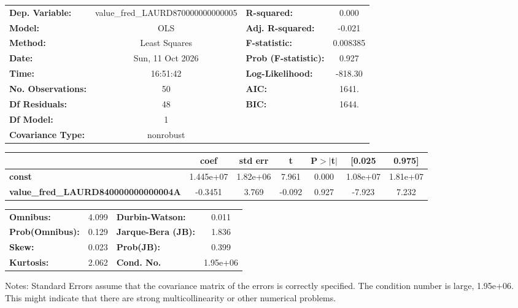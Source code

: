 \begin{center}
\begin{tabular}{lclc}
\toprule
\textbf{Dep. Variable:}                     & value\_fred\_LAURD870000000000005 & \textbf{  R-squared:         } &     0.000   \\
\textbf{Model:}                             &                OLS                & \textbf{  Adj. R-squared:    } &    -0.021   \\
\textbf{Method:}                            &           Least Squares           & \textbf{  F-statistic:       } &  0.008385   \\
\textbf{Date:}                              &          Sun, 11 Oct 2026         & \textbf{  Prob (F-statistic):} &    0.927    \\
\textbf{Time:}                              &              16:51:42             & \textbf{  Log-Likelihood:    } &   -818.30   \\
\textbf{No. Observations:}                  &                   50              & \textbf{  AIC:               } &     1641.   \\
\textbf{Df Residuals:}                      &                   48              & \textbf{  BIC:               } &     1644.   \\
\textbf{Df Model:}                          &                    1              & \textbf{                     } &             \\
\textbf{Covariance Type:}                   &             nonrobust             & \textbf{                     } &             \\
\bottomrule
\end{tabular}
\begin{tabular}{lcccccc}
                                            & \textbf{coef} & \textbf{std err} & \textbf{t} & \textbf{P$> |$t$|$} & \textbf{[0.025} & \textbf{0.975]}  \\
\midrule
\textbf{const}                              &    1.445e+07  &     1.82e+06     &     7.961  &         0.000        &     1.08e+07    &     1.81e+07     \\
\textbf{value\_fred\_LAURD840000000000004A} &      -0.3451  &        3.769     &    -0.092  &         0.927        &       -7.923    &        7.232     \\
\bottomrule
\end{tabular}
\begin{tabular}{lclc}
\textbf{Omnibus:}       &  4.099 & \textbf{  Durbin-Watson:     } &    0.011  \\
\textbf{Prob(Omnibus):} &  0.129 & \textbf{  Jarque-Bera (JB):  } &    1.836  \\
\textbf{Skew:}          &  0.023 & \textbf{  Prob(JB):          } &    0.399  \\
\textbf{Kurtosis:}      &  2.062 & \textbf{  Cond. No.          } & 1.95e+06  \\
\bottomrule
\end{tabular}
\end{center}

Notes: \newline
 [1] Standard Errors assume that the covariance matrix of the errors is correctly specified. \newline
 [2] The condition number is large, 1.95e+06. This might indicate that there are \newline
 strong multicollinearity or other numerical problems.